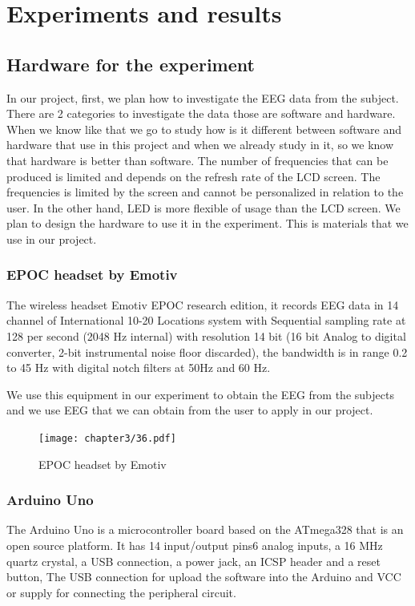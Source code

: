 \chapter{Experiments and results}

\label{ch:Experiments and results}

\setlength{\parindent}{4em}
\setlength{\parskip}{1em}
\renewcommand{\baselinestretch}{1.5}

\section{Hardware for the experiment}

\hspace{1.5cm} In our project, first, we plan how to investigate the EEG data from the subject. There are 2 categories to investigate the data those are software and hardware. When we know like that we go to study how is it different between software and hardware that use in this project and when we already study in it, so we know that hardware is better than software. The number of frequencies that can be produced is limited and depends on the refresh rate of the LCD screen. The frequencies is limited by the screen and cannot be personalized in relation to the user. In the other hand, LED is more flexible of usage than the LCD screen. We plan to design the hardware to use it in the experiment. This is materials that we use in our project.

\subsection{EPOC headset by Emotiv\texttrademark}
\hspace{1.5cm} The wireless headset Emotiv EPOC research edition, it records EEG data in 14 channel of International 10-20 Locations system with Sequential sampling rate at 128 per second (2048 Hz internal) with resolution 14 bit (16 bit Analog to digital converter, 2-bit instrumental noise floor discarded), the bandwidth is in range 0.2 to 45 Hz with digital notch filters at 50Hz and 60 Hz.

We use this equipment in our experiment to obtain the EEG from the subjects and we use EEG that we can obtain from the user to apply in our project.
\begin{figure}[ht]
	\centering
	\texttt{[image: chapter3/36.pdf]}
	\caption{EPOC headset by Emotiv\texttrademark}
\end{figure}

\subsection{Arduino Uno}
\hspace{1.5cm} The Arduino Uno is a microcontroller board based on the ATmega328 that is an open source platform. It has 14 input/output pins6 analog inputs, a 16 MHz quartz crystal, a USB connection, a power jack, an ICSP header and a reset button, The USB connection for upload the software into the Arduino and VCC or supply for connecting the peripheral circuit.

